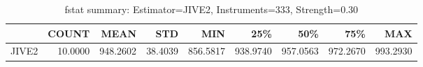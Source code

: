 \begin{table}[ht]
\centering
\caption{fstat summary: Estimator=JIVE2, Instruments=333, Strength=0.30}
\begin{tabular}{lrrrrrrrr}
\toprule
 & COUNT & MEAN & STD & MIN & 25\% & 50\% & 75\% & MAX \\
\midrule
JIVE2 & 10.0000 & 948.2602 & 38.4039 & 856.5817 & 938.9740 & 957.0563 & 972.2670 & 993.2930 \\
\bottomrule
\end{tabular}
\end{table}
